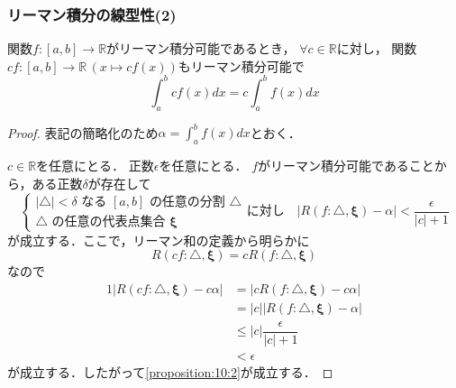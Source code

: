 \documentclass[./index]{subfiles}
\begin{document}
\subsubsection{リーマン積分の線型性(2)}

\begin{screen}
    \begin{proposition}
        関数$f:[a,b]\rightarrow\mathbb{R}$がリーマン積分可能であるとき，
        $\forall c \in \mathbb{R}$に対し，
        関数$cf: [a,b] \rightarrow \mathbb{R} \, (x \mapsto cf(x))$もリーマン積分可能で
        \begin{equation}
            \int_a^b cf(x) dx = c \int_a^b f(x) dx
            \label{proposition:10:2}
        \end{equation}
    \end{proposition}
\end{screen}

\begin{proof}
    表記の簡略化のため$\alpha = \int_a^b f(x) dx$とおく．

    $c \in \mathbb{R}$を任意にとる．
    正数$\epsilon$を任意にとる．
    $f$がリーマン積分可能であることから，ある正数$\delta$が存在して
    \begin{equation}
        \nonumber
        \begin{cases}
            |\triangle| < \delta \mbox{ なる } [a, b] \mbox{ の任意の分割 } \triangle \\
            \triangle \mbox{ の任意の代表点集合 } \mathbf{\xi}
        \end{cases}
        \mbox{に対し} \quad
        |R(f: \triangle, \mathbf{\xi}) - \alpha| < \dfrac{\epsilon}{|c| + 1}
    \end{equation}
    が成立する．ここで，リーマン和の定義から明らかに
    \begin{equation}
        R(cf: \triangle, \mathbf{\xi}) = cR(f: \triangle, \mathbf{\xi})
    \end{equation}
    なので
    \begin{alignat}{1}
        |R(cf: \triangle, \mathbf{\xi}) - c\alpha|
            &= |cR(f: \triangle, \mathbf{\xi}) - c\alpha| \\
            &= |c||R(f: \triangle, \mathbf{\xi}) - \alpha| \\
            &\leq |c| \dfrac{\epsilon}{|c| + 1} \\
            &< \epsilon
    \end{alignat}
    が成立する．したがって\cref{proposition:10:2}が成立する．
\end{proof}
\end{document}
